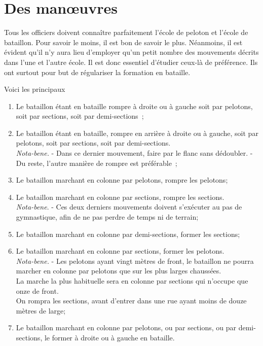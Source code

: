 \documentclass[french,twoside]{book} %
\begin{document}
\section[{Des manœuvres}]{Des manœuvres}\renewcommand{\leftmark}{Des manœuvres}

\noindent Tous les officiers doivent connaître parfaitement l’école de peloton et l’école de bataillon. Pour savoir le moins, il est bon de savoir le plus. Néanmoins, il est évident qu’il n’y aura lieu d’employer qu’un petit nombre des mouvements décrits dans l’une et l’autre école. Il est donc essentiel d’étudier ceux-là de préférence. Ils ont surtout pour but de régulariser la formation en bataille.\par
Voici les principaux\par

\begin{enumerate}[itemsep=0pt,]
\item Le bataillon étant en bataille rompre à droite ou à gauche soit par pelotons, soit par sections, soit par demi-sections ;
\item Le bataillon étant en bataille, rompre en arrière à droite ou à gauche, soit par pelotons, soit par sections, soit par demi-sections. \\
\emph{Nota-bene.} - Dans ce dernier mouvement, faire par le flanc sans dédoubler. - Du reste, l’autre manière de rompre est préférable ;
\item Le bataillon marchant en colonne par pelotons, rompre les pelotons;
\item Le bataillon marchant en colonne par sections, rompre les sections. \\
\emph{Nota-bene}. - Ces deux derniers mouvements doivent s’exécuter au pas de gymnastique, afin de ne pas perdre de temps ni de terrain;
\item Le bataillon marchant en colonne par demi-sections, former les sections;
\item Le bataillon marchant en colonne par sections, former les pelotons. \\
\emph{Nota-bene.} - Les pelotons ayant vingt mètres de front, le bataillon ne pourra marcher en colonne par pelotons que sur les plus larges chaussées. \\
La marche la plus habituelle sera en colonne par sections qui n’occupe que onze de front. \\
On rompra les sections, avant d’entrer dans une rue ayant moins de douze mètres de large;
\item Le bataillon marchant en colonne par pelotons, ou par sections, ou par demi-sections, le former à droite ou à gauche en bataille.\emph{ \\
}
\end{enumerate}
\end{document}
